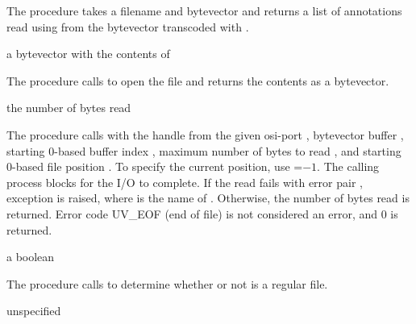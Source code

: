 The  procedure takes a filename  and
 bytevector and returns a list of annotations read using
 from the  bytevector
transcoded with .

\begin{procedure}
\end{procedure}
\returns{} a bytevector with the contents of 

The  procedure calls  to open the file  and returns the contents
as a bytevector.

\begin{procedure}
\end{procedure}
\returns{} the number of bytes read

The  procedure calls  with
the handle from the given osi-port , bytevector buffer
, starting 0-based buffer index , maximum number of
bytes to read , and starting 0-based file position . To
specify the current position, use =$-1$. The calling process
blocks for the I/O to complete. If the read fails with error pair
, exception  is raised, where  is
the name of . Otherwise, the number of bytes read is
returned. Error code UV\_EOF (end of file) is not considered an error,
and 0 is returned.

\begin{procedure}
\end{procedure}
\returns{} a boolean

The  procedure calls 
to determine whether or not  is a regular file.

\begin{procedure}
\end{procedure}
\returns{} unspecified

